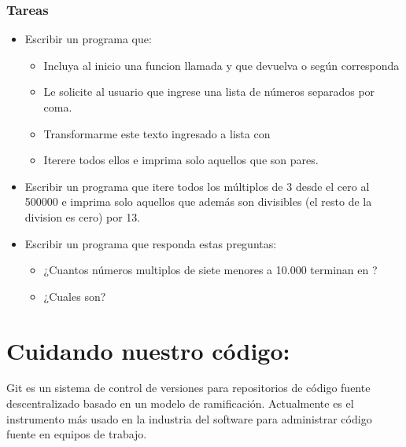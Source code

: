 \documentclass[a4paper,12pt,spanish]{sphinxmanual}
\begin{document}
\subsection{Tareas}
\label{\detokenize{for:tareas}}\begin{itemize}
\item {} 
\sphinxAtStartPar
Escribir un programa que:
\begin{itemize}
\item {} 
\sphinxAtStartPar
Incluya al inicio una funcion llamada  y que devuelva
 o  según corresponda

\item {} 
\sphinxAtStartPar
Le solicite al usuario que ingrese una lista de números separados por coma.

\item {} 
\sphinxAtStartPar
Transformarme este texto ingresado a lista con 

\item {} 
\sphinxAtStartPar
Iterere todos ellos e imprima solo aquellos que son pares.

\end{itemize}

\item {} 
\sphinxAtStartPar
Escribir un programa que itere todos los múltiplos de 3 desde el cero
al 500000 e imprima solo aquellos que además son divisibles (el resto
de la division es cero) por 13.

\item {} 
\sphinxAtStartPar
Escribir un programa que responda estas preguntas:
\begin{itemize}
\item {} 
\sphinxAtStartPar
¿Cuantos números multiplos de siete menores a 10.000 terminan en ?

\item {} 
\sphinxAtStartPar
¿Cuales son?

\end{itemize}

\end{itemize}

\sphinxstepscope


\chapter{Cuidando nuestro código: }
\label{\detokenize{git:cuidando-nuestro-codigo-git}}\label{\detokenize{git::doc}}
\sphinxAtStartPar
Git es un sistema de control de versiones para repositorios de código fuente
descentralizado basado en un modelo de ramificación.
Actualmente es el instrumento más usado en la industria del software para
administrar código fuente en equipos de trabajo.
\end{document}
